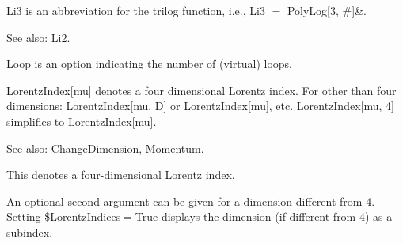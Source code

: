 


 Li3 is an abbreviation for the trilog function, i.e., Li3 \(=\) PolyLog[3, \#{}]\&{}.

See also: Li2.








Loop is an option indicating the number of (virtual) loops.



LorentzIndex[mu] denotes a four dimensional Lorentz index. For other than four dimensions: LorentzIndex[mu, D] or LorentzIndex[mu], etc.
  LorentzIndex[mu, 4] simplifies to LorentzIndex[mu].

See also:  ChangeDimension, Momentum.


This denotes a four-dimensional Lorentz index.


\dispSFoutmath{
\alpha
}

An optional second argument can be given for a dimension different from 4.
Setting \${}LorentzIndices\(=\)True displays the dimension (if different from 4) as a subindex.


\dispSFoutmath{
\alpha
}


\dispSFoutmath{
{{\alpha }^*}
}


\dispSFoutmath{
\mu
}


